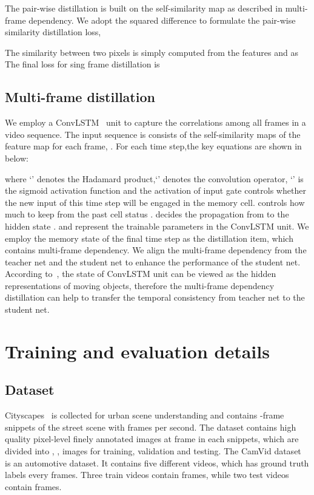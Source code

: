 \documentclass[runningheads]{llncs}
\begin{document}
The pair-wise distillation is built on the self-similarity map  as described in multi-frame dependency. We adopt the squared difference to formulate the pair-wise similarity distillation loss,

The similarity between two pixels is simply computed
from the features 
and 
as 
The final loss for sing frame distillation is 
\subsection{Multi-frame distillation}
We employ a ConvLSTM~\cite{ConvLSTM} unit to capture the correlations among all frames in a video sequence. The input sequence is consists of the self-similarity maps of the feature map for each frame, . For each time step,the key equations are shown in below:


where `' denotes the Hadamard product,`' denotes the convolution operator, `' is the sigmoid activation function and the activation of input gate  controls whether the new input of this time step will be engaged in the memory cell.  controls how much to keep from the past cell status .  decides the propagation from  to the hidden state .   and  represent the trainable parameters in the ConvLSTM unit. We employ the memory state of the final time step  as the distillation item, which contains multi-frame dependency. We align the multi-frame dependency from the teacher net and the student net to enhance the performance of the student net. According to~\cite{ConvLSTM}, the state of ConvLSTM unit can be viewed as the hidden representations of moving objects, therefore the multi-frame dependency distillation can help to transfer the temporal consistency from teacher net to the student net.
\section{Training and evaluation details }
\subsection{Dataset}
Cityscapes~\cite{Cordts2016Cityscapes}
is collected for urban scene understanding
and contains -frame snippets of the street scene with  frames per second.
The dataset contains  high quality pixel-level finely annotated images at  frame in each snippets, which are divided into , ,   images for training, validation and testing. The CamVid dataset~\cite{brostow2008segmentation} is an automotive dataset. It contains five different videos, which has ground truth labels every  frames.
Three train videos contain  frames, while two test videos contain  frames.
\end{document}
